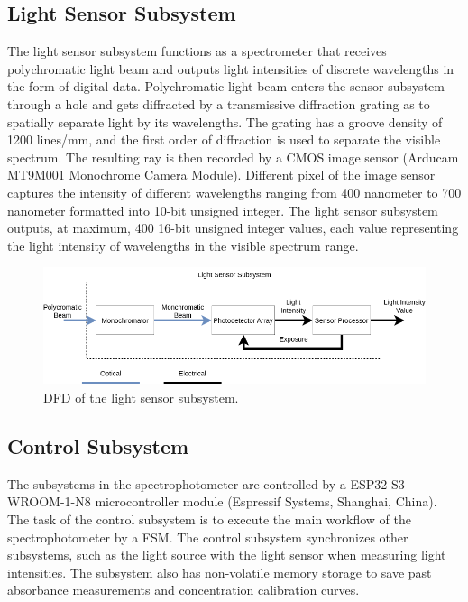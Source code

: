 \documentclass[conference]{IEEEtran}
\begin{document}
\subsection{Light Sensor Subsystem}
The light sensor subsystem functions as a spectrometer that receives polychromatic light beam and outputs light intensities of discrete wavelengths in the form of digital data.
Polychromatic light beam enters the sensor subsystem through a hole and gets diffracted by a transmissive diffraction grating as to spatially separate light by its wavelengths.
The grating has a groove density of 1200 lines/mm, and the first order of diffraction is used to separate the visible spectrum.
The resulting ray is then recorded by a CMOS image sensor (Arducam MT9M001 Monochrome Camera Module).
Different pixel of the image sensor captures the intensity of different wavelengths ranging from 400 nanometer to 700 nanometer formatted into 10-bit unsigned integer.
The light sensor subsystem outputs, at maximum, 400 16-bit unsigned integer values, each value representing the light intensity of wavelengths in the visible spectrum range. 

    \begin{figure}[htbp]
    \centerline{\includegraphics[scale=0.33]{light-sensor-dfd.png}}
    \caption{DFD of the light sensor subsystem.}
    \label{light-sensor-dfd}
    \end{figure}

\subsection{Control Subsystem}
The subsystems in the spectrophotometer are controlled by a ESP32-S3-WROOM-1-N8 microcontroller module (Espressif Systems, Shanghai, China). The task of the control subsystem is to execute the main workflow of the spectrophotometer by a FSM. The control subsystem synchronizes other subsystems, such as the light source with the light sensor when measuring light intensities. The subsystem also has non-volatile memory storage to save past absorbance measurements and concentration calibration curves.
\end{document}
